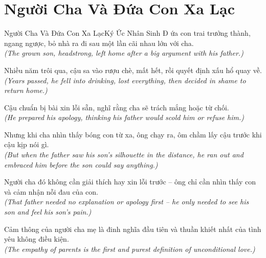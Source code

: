 \section{Người Cha Và Đứa Con Xa Lạc}
\begin{truyen}{Người Cha Và Đứa Con Xa Lạc}{Ký Ức Nhân Sinh}
Đ ứa con trai trưởng thành, ngang ngược, bỏ nhà ra đi sau một lần cãi nhau lớn với cha.\\
\textit{(The grown son, headstrong, left home after a big argument with his father.)}

Nhiều năm trôi qua, cậu sa vào rượu chè, mất hết, rồi quyết định xấu hổ quay về.\\
\textit{(Years passed, he fell into drinking, lost everything, then decided in shame to return home.)}

Cậu chuẩn bị bài xin lỗi sẵn, nghĩ rằng cha sẽ trách mắng hoặc từ chối.\\
\textit{(He prepared his apology, thinking his father would scold him or refuse him.)}

Nhưng khi cha nhìn thấy bóng con từ xa, ông chạy ra, ôm chầm lấy cậu trước khi cậu kịp nói gì.\\
\textit{(But when the father saw his son's silhouette in the distance, he ran out and embraced him before the son could say anything.)}

Người cha đó không cần giải thích hay xin lỗi trước -- ông chỉ cần nhìn thấy con và cảm nhận nỗi đau của con.\\
\textit{(That father needed no explanation or apology first -- he only needed to see his son and feel his son's pain.)}

\end{truyen}
\begin{baihoc}
  Cảm thông của người cha mẹ là đinh nghĩa đầu tiên và thuần khiết nhất của tình yêu không điều kiện.\\
  \textit{(The empathy of parents is the first and purest definition of unconditional love.)}
\end{baihoc}

